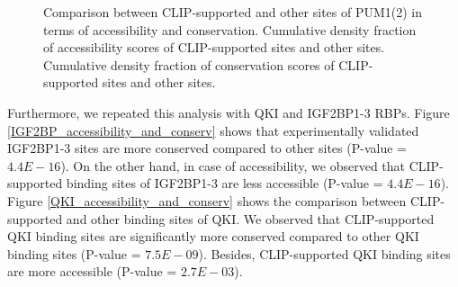 \begin{figure}[H]
	\centering
\quad
\caption[Accessibility and conservation scores of PUM protein]{Comparison between CLIP-supported and other sites of PUM1(2) in terms of accessibility and conservation.  Cumulative density fraction of accessibility scores of CLIP-supported sites and other sites.  Cumulative density fraction of conservation scores of CLIP-supported sites and other sites.}
\label{PUM_accessibility_and_conserv}
\end{figure}

\clearpage
Furthermore, we repeated this analysis with QKI and IGF2BP1-3 RBPs. Figure \ref{IGF2BP_accessibility_and_conserv} shows that experimentally validated IGF2BP1-3 sites are more conserved compared to other sites (P-value = $4.4E-16$). On the other hand, in case of accessibility, we observed that CLIP-supported binding sites of IGF2BP1-3 are less accessible (P-value = $4.4E-16$). Figure \ref{QKI_accessibility_and_conserv} shows the comparison between CLIP-supported and other binding sites of QKI. We observed that CLIP-supported QKI binding sites are significantly more conserved compared to other QKI binding sites (P-value = $7.5E-09$). Besides, CLIP-supported QKI binding sites are more accessible (P-value = $2.7E-03$).

